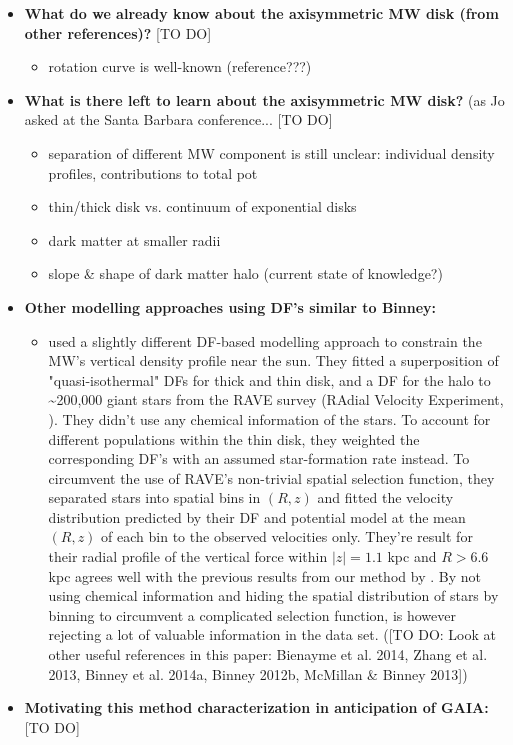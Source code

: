 \documentclass[12pt,preprint]{aastex}
\begin{document}
\begin{itemize}
\item \textbf{What do we already know about the axisymmetric MW disk (from other references)?} [TO DO]
\begin{itemize}
\item rotation curve is well-known (reference???)
\end{itemize}

\item \textbf{What is there left to learn about the axisymmetric MW disk?} (as Jo asked at the Santa Barbara conference... [TO DO]
\begin{itemize}
\item separation of different MW component is still unclear: individual density profiles, contributions to total pot
\item thin/thick disk vs. continuum of exponential disks
\item dark matter at smaller radii
\item slope \& shape of dark matter halo (current state of knowledge?)
\end{itemize} 

\item \textbf{Other modelling approaches using DF's similar to Binney:}
\begin{itemize}
\item \citet{pif14} used a slightly different DF-based modelling approach to constrain the MW's vertical density profile near the sun. They fitted a superposition of "quasi-isothermal" DFs for thick and thin disk, and a DF for the halo to \textasciitilde200,000 giant stars from the RAVE survey (RAdial Velocity Experiment, \citet{ste06}). They didn't use any chemical information of the stars. To account for different populations within the thin disk, they weighted the corresponding DF's with an assumed star-formation rate instead. To circumvent the use of RAVE's non-trivial spatial selection function, they separated stars into spatial bins in $(R,z)$ and fitted the velocity distribution predicted by their DF and potential model at the mean $(R,z)$ of each bin to the observed velocities only. They're result for their radial profile of the vertical force within $|z|=1.1$ kpc and $R>6.6$ kpc agrees well with the previous results from our method by \citet{bov13}. By not using chemical information and hiding the spatial distribution of stars by binning to circumvent a complicated selection function, \citet{pif14} is however rejecting a lot of valuable information in the data set. ([TO DO: Look at other useful references in this paper: Bienayme et al. 2014, Zhang et al. 2013, Binney et al. 2014a, Binney 2012b, McMillan \& Binney 2013])
\end{itemize}



\item \textbf{Motivating this method characterization in anticipation of GAIA:} [TO DO]
\end{itemize}
\end{document}
